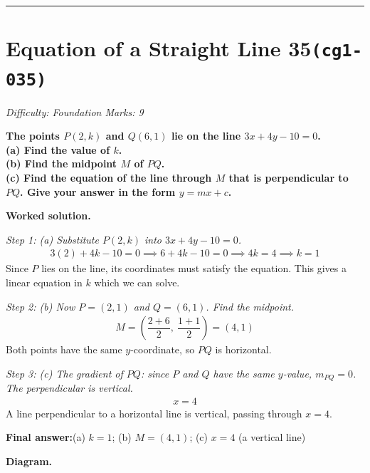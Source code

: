 \documentclass[11pt]{article}
\newcommand{\question}[1]{\par\medskip\noindent\textbf{#1}\par}
\begin{document}
\medskip\hrule

\section*{Equation of a Straight Line 35\quad\small\texttt{(cg1-035)}}
\textit{Difficulty: Foundation \quad\textbar\quad Marks: 9}

\question{The points \( P(2, k) \) and \( Q(6, 1) \) lie on the line \( 3x + 4y - 10 = 0 \). \\[3pt] (a) Find the value of \( k \). \\[3pt] (b) Find the midpoint \( M \) of \( PQ \). \\[3pt] (c) Find the equation of the line through \( M \) that is perpendicular to \( PQ \). Give your answer in the form \( y = mx + c \).}

\textbf{Worked solution.}

\textit{Step 1: (a) Substitute \( P(2, k) \) into \( 3x + 4y - 10 = 0 \).}
\[\begin{gathered}
3(2) + 4k - 10 = 0 \implies 6 + 4k - 10 = 0 \implies 4k = 4 \implies k = 1
\end{gathered}\]
Since \(P\) lies on the line, its coordinates must satisfy the equation. This gives a linear equation in \(k\) which we can solve.

\textit{Step 2: (b) Now \( P = (2, 1) \) and \( Q = (6, 1) \). Find the midpoint.}
\[\begin{gathered}
M = \left(\dfrac{2+6}{2},\ \dfrac{1+1}{2}\right) = (4, 1)
\end{gathered}\]
Both points have the same \( y \)-coordinate, so \( PQ \) is horizontal.

\textit{Step 3: (c) The gradient of \( PQ \): since \( P \) and \( Q \) have the same \( y \)-value, \( m_{PQ} = 0 \). The perpendicular is vertical.}
\[\begin{gathered}
x = 4
\end{gathered}\]
A line perpendicular to a horizontal line is vertical, passing through \( x = 4 \).

\begin{answerbox}
\textbf{Final answer:}\quad (a) \(\displaystyle k = 1\); (b) \(\displaystyle M = (4, 1)\); (c) \(\displaystyle x = 4\) (a vertical line)
\end{answerbox}
\textbf{Diagram.}
\end{document}
